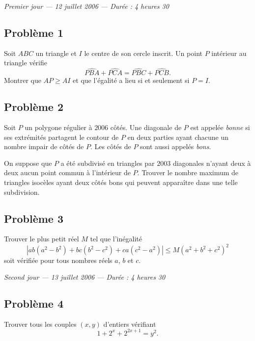
\begin{center}
  \emph{Premier jour --- 12 juillet 2006 --- Durée : 4 heures 30}
\end{center}

\subsection*{Problème 1}
Soit $ABC$ un triangle et $I$ le centre de son cercle inscrit. Un point $P$ intérieur au triangle vérifie
\[
\widehat{PBA} + \widehat{PCA} = \widehat{PBC} + \widehat{PCB}.
\]
Montrer que $AP \geq AI$ et que l'égalité a lieu si et seulement si $P = I$.

\subsection*{Problème 2}
Soit $P$ un polygone régulier à $2006$ côtés. Une diagonale de $P$ est appelée \emph{bonne} si ses extrémités
partagent le contour de $P$ en deux parties ayant chacune un nombre impair de côtés de $P$. Les côtés de $P$
sont aussi appelés \emph{bons}.

On suppose que $P$ a été subdivisé en triangles par $2003$ diagonales n'ayant deux à deux aucun point commun à
l'intérieur de $P$. Trouver le nombre maximum de triangles isocèles ayant deux côtés bons qui peuvent
apparaître dans une telle subdivision.

\subsection*{Problème 3}
Trouver le plus petit réel $M$ tel que l'inégalité
\[
\left|ab(a^2 - b^2) + bc(b^2 - c^2) + ca(c^2 - a^2)\right| \leq M(a^2 + b^2 + c^2)^2
\]
soit vérifiée pour tous nombres réels $a$, $b$ et $c$.

\bigskip
\begin{center}
  \emph{Second jour --- 13 juillet 2006 --- Durée : 4 heures 30}
\end{center}

\subsection*{Problème 4}
Trouver tous les couples $(x, y)$ d'entiers vérifiant
\[
1 + 2^x + 2^{2x+1} = y^2.
\]

